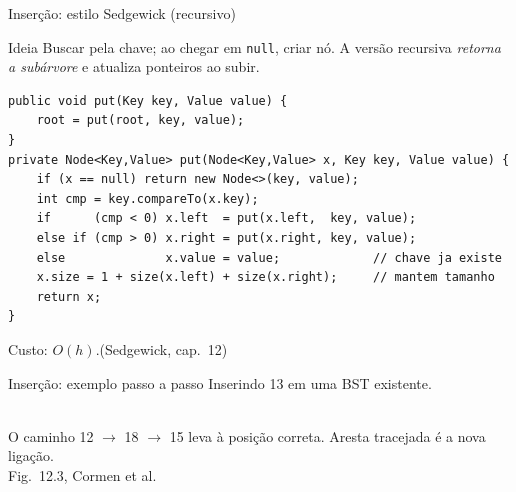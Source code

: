 \documentclass[aspectratio=169]{beamer}
\begin{document}
\begin{frame}[fragile,shrink=15]{Inserção: estilo Sedgewick (recursivo)}
\begin{block}{Ideia}
Buscar pela chave; ao chegar em \texttt{null}, criar nó. A versão recursiva
\emph{retorna a subárvore} e atualiza ponteiros ao subir.
\end{block}
\begin{lstlisting}
public void put(Key key, Value value) {
    root = put(root, key, value);
}
private Node<Key,Value> put(Node<Key,Value> x, Key key, Value value) {
    if (x == null) return new Node<>(key, value);
    int cmp = key.compareTo(x.key);
    if      (cmp < 0) x.left  = put(x.left,  key, value);
    else if (cmp > 0) x.right = put(x.right, key, value);
    else              x.value = value;             // chave ja existe
    x.size = 1 + size(x.left) + size(x.right);     // mantem tamanho
    return x;
}
\end{lstlisting}
Custo: $O(h)$.\hfill\tiny{(Sedgewick, cap.\ 12)}
\end{frame}

\begin{frame}{Inserção: exemplo passo a passo}
\centering
Inserindo \alert{13} em uma BST existente.\\[4pt]
\\[4pt]
\small O caminho 12 $\to$ 18 $\to$ 15 leva à posição correta. Aresta tracejada é a nova ligação.\\
\hfill\tiny{Fig.\ 12.3, Cormen et al.}
\end{frame}
\end{document}
